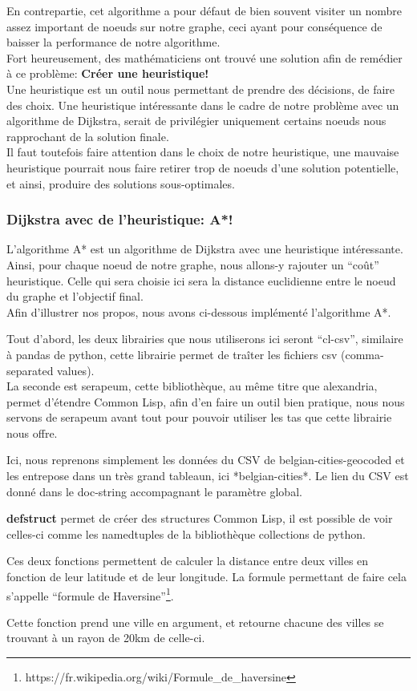 \documentclass[a4paper, 12pt]{article}
\newcommand{\pather}[1]{
  
}
\numberwithin{equation}{subsection}
\begin{document}
En contrepartie, cet algorithme a pour défaut de bien souvent visiter un nombre assez important de noeuds sur notre graphe, ceci ayant pour conséquence de baisser la performance de notre algorithme. \\

Fort heureusement, des mathématiciens ont trouvé une solution afin de remédier à ce problème: {\bf Créer une heuristique!} \\

Une heuristique est un outil nous permettant de prendre des décisions, de faire des choix. Une heuristique intéressante dans le cadre de notre problème avec un algorithme de Dijkstra, serait de privilégier uniquement certains noeuds nous rapprochant de la solution finale. \\

Il faut toutefois faire attention dans le choix de notre heuristique,
une mauvaise heuristique pourrait nous faire retirer trop de noeuds d'une solution potentielle, et ainsi, produire des solutions sous-optimales. \\
\subsubsection{Dijkstra avec de l'heuristique: A*!}
L'algorithme A* est un algorithme de Dijkstra avec une heuristique intéressante. \\

Ainsi, pour chaque noeud de notre graphe, nous allons-y rajouter un ``coût'' heuristique. Celle qui sera choisie ici sera la distance euclidienne entre le noeud du graphe et l'objectif final. \\
Afin d'illustrer nos propos, nous avons ci-dessous implémenté l'algorithme A*.
\pather{1-2}
Tout d'abord, les deux librairies que nous utiliserons ici seront ``cl-csv'', similaire à pandas de python, cette librairie permet de traîter les fichiers csv (comma-separated values). \\

La seconde est serapeum, cette bibliothèque, au même titre que alexandria, permet d'étendre Common Lisp, afin d'en faire un outil bien pratique, nous nous servons de serapeum avant tout pour pouvoir utiliser les tas que cette librairie nous offre.
\pather{7-25}
Ici, nous reprenons simplement les données du CSV de belgian-cities-geocoded et les entrepose dans un très grand tableaun, ici *belgian-cities*. Le lien du CSV est donné dans le doc-string accompagnant le paramètre global.
\pather{4-5}
{\bf defstruct} permet de créer des structures Common Lisp, il est possible de voir celles-ci comme les namedtuples de la bibliothèque collections de python.
\pather{28-53}
Ces deux fonctions permettent de calculer la distance entre deux villes en fonction de leur latitude et de leur longitude. La formule permettant de faire cela s'appelle ``formule de Haversine''\footnote{https://fr.wikipedia.org/wiki/Formule\_de\_haversine}.
\pather{55-62}
Cette fonction prend une ville en argument, et retourne chacune des villes se trouvant à un rayon de 20km de celle-ci. \\
\end{document}
